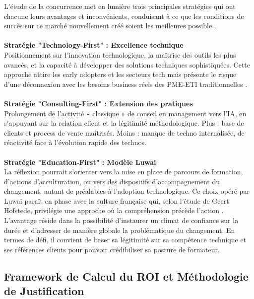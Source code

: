  L’étude de la concurrence met en lumière trois principales stratégies qui ont chacune leurs avantages et inconvénients, conduisant à ce que les conditions de succès sur ce marché nouvellement créé soient les meilleures possible \cite{porter1985competitive}. 
\\\\
\textbf{Stratégie "Technology-First" : Excellence technique}\\
Positionnement sur l'innovation technologique, la maîtrise des outils les plus avancés, et la capacité à développer des solutions techniques sophistiquées. Cette approche attire les early adopters et les secteurs tech mais présente le risque d'une déconnexion avec les besoins business réels des PME-ETI traditionnelles \cite{christensen1997innovator}.
\\\\
\textbf{Stratégie "Consulting-First" : Extension des pratiques}\\
Prolongement de l’activité « classique » de conseil en management vers l’IA, en s’appuyant sur la relation client et la légitimité méthodologique. Plus : base de clients et process de vente maîtrisés. Moins : manque de techno internalisée, de réactivité face à l’évolution rapide des technos.
\\\\
\textbf{Stratégie "Education-First" : Modèle Luwai}\\
La réflexion pourrait s’orienter vers la mise en place de parcours de formation, d’actions d’acculturation, ou vers des dispositifs d’accompagnement du changement, autant de préalables à l’adoption technologique. Ce choix opéré par Luwai paraît en phase avec la culture française qui, selon l’étude de Geert Hofstede, privilégie une approche où la compréhension précède l’action \cite{hofstede2001culture}. L’avantage réside dans la possibilité d’instaurer un climat de confiance sur la durée et d’adresser de manière globale la problématique du changement. En termes de défi, il convient de baser sa légitimité sur sa compétence technique et ses références clients pour pouvoir crédibiliser sa posture de formateur.


\subsection{Framework de Calcul du ROI et Méthodologie de Justification}
\label{sec:roi_framework}

